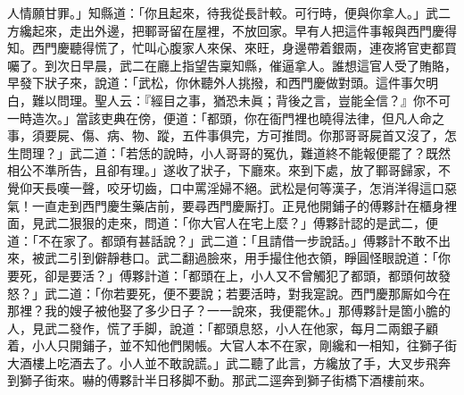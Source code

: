 人情願甘罪。」知縣道：「你且起來，待我從長計較。{}可行時，便與你拿人。」武二方纔起來，走出外邊，把鄆哥留在屋裡，不放回家。{}早有人把這件事報與西門慶得知。西門慶聽得慌了，忙叫心腹家人來保、來旺，{}身邊帶着銀兩，連夜將官吏都買囑了。到次日早晨，武二在廳上指望告稟知縣，催逼拿人。誰想這官人受了賄賂，早發下狀子來，說道：「武松，你休聽外人挑撥，和西門慶做對頭。這件事欠明白，難以問理。聖人云：『經目之事，猶恐未眞；背後之言，豈能全信？』你不可一時造次。」當該吏典在傍，便道：「都頭，你在衙門裡也曉得法律，但凡人命之事，須要屍、傷、病、物、蹤，五件事俱完，方可推問。你那哥哥屍首又沒了，怎生問理？」{}武二道：「若恁的說時，小人哥哥的冤仇，難道終不能報便罷了？既然相公不準所告，且卻有理。」遂收了狀子，下廳來。來到下處，放了鄆哥歸家，不覺仰天長嘆一聲，咬牙切齒，口中罵淫婦不絕。武松是何等漢子，怎消洋得這口惡氣！一直走到西門慶生藥店前，要尋西門慶厮打。正見他開鋪子的傅夥計在櫃身裡面，見武二狠狠的走來，問道：「你大官人在宅上麼？」傅夥計認的是武二，便道：「不在家了。都頭有甚話說？」武二道：「且請借一步說話。」傅夥計不敢不出來，被武二引到僻靜巷口。武二翻過臉來，用手撮住他衣領，睜圓怪眼說道：「你要死，卻是要活？」{}傅夥計道：「都頭在上，小人又不曾觸犯了都頭，都頭何故發怒？」武二道：「你若要死，便不要說；若要活時，對我寔說。西門慶那厮如今在那裡？我的嫂子被他娶了多少日子？一一說來，我便罷休。」那傅夥計是箇小膽的人，見武二發作，慌了手脚，說道：「都頭息怒，小人在他家，每月二兩銀子顧着，小人只開鋪子，並不知他們閑帳。大官人本不在家，剛纔和一相知，往獅子街大酒樓上吃酒去了。小人並不敢說謊。」{}武二聽了此言，方纔放了手，大叉步飛奔到獅子街來。嚇的傅夥計半日移脚不動。那武二逕奔到獅子街橋下酒樓前來。

